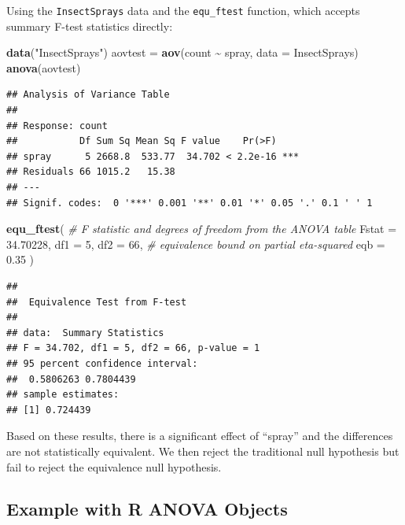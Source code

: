 \documentclass[]{interact}
\theoremstyle{plain}%
\theoremstyle{definition}
\theoremstyle{remark}
\newenvironment{Shaded}{\begin{snugshade}}{\end{snugshade}}
\newcommand{\AttributeTok}[1]{\textcolor[rgb]{0.13,0.29,0.53}{#1}}
\newcommand{\CommentTok}[1]{\textcolor[rgb]{0.56,0.35,0.01}{\textit{#1}}}
\newcommand{\DecValTok}[1]{\textcolor[rgb]{0.00,0.00,0.81}{#1}}
\newcommand{\FloatTok}[1]{\textcolor[rgb]{0.00,0.00,0.81}{#1}}
\newcommand{\FunctionTok}[1]{\textcolor[rgb]{0.13,0.29,0.53}{\textbf{#1}}}
\newcommand{\NormalTok}[1]{#1}
\newcommand{\OtherTok}[1]{\textcolor[rgb]{0.56,0.35,0.01}{#1}}
\newcommand{\SpecialCharTok}[1]{\textcolor[rgb]{0.81,0.36,0.00}{\textbf{#1}}}
\newcommand{\StringTok}[1]{\textcolor[rgb]{0.31,0.60,0.02}{#1}}
\begin{document}
Using the \texttt{InsectSprays} data and the \texttt{equ\_ftest}
function, which accepts summary F-test statistics directly:

\begin{Shaded}
\begin{Highlighting}[]
\FunctionTok{data}\NormalTok{(}\StringTok{"InsectSprays"}\NormalTok{)}
\NormalTok{aovtest }\OtherTok{=} \FunctionTok{aov}\NormalTok{(count }\SpecialCharTok{\textasciitilde{}}\NormalTok{ spray, }\AttributeTok{data =}\NormalTok{ InsectSprays)}
\FunctionTok{anova}\NormalTok{(aovtest)}
\end{Highlighting}
\end{Shaded}

\begin{verbatim}
## Analysis of Variance Table
## 
## Response: count
##           Df Sum Sq Mean Sq F value    Pr(>F)    
## spray      5 2668.8  533.77  34.702 < 2.2e-16 ***
## Residuals 66 1015.2   15.38                      
## ---
## Signif. codes:  0 '***' 0.001 '**' 0.01 '*' 0.05 '.' 0.1 ' ' 1
\end{verbatim}

\begin{Shaded}
\begin{Highlighting}[]
\FunctionTok{equ\_ftest}\NormalTok{(}
  \CommentTok{\# F statistic and degrees of freedom from the ANOVA table}
  \AttributeTok{Fstat =} \FloatTok{34.70228}\NormalTok{,}
  \AttributeTok{df1 =} \DecValTok{5}\NormalTok{,}
  \AttributeTok{df2 =} \DecValTok{66}\NormalTok{,}
  \CommentTok{\# equivalence bound on partial eta{-}squared}
  \AttributeTok{eqb =} \FloatTok{0.35}
\NormalTok{)}
\end{Highlighting}
\end{Shaded}

\begin{verbatim}
## 
##  Equivalence Test from F-test
## 
## data:  Summary Statistics
## F = 34.702, df1 = 5, df2 = 66, p-value = 1
## 95 percent confidence interval:
##  0.5806263 0.7804439
## sample estimates:
## [1] 0.724439
\end{verbatim}

Based on these results, there is a significant effect of ``spray'' and
the differences are not statistically equivalent. We then reject the
traditional null hypothesis but fail to reject the equivalence null
hypothesis.

\subsection{Example with R ANOVA
Objects}\label{example-with-r-anova-objects}
\end{document}
